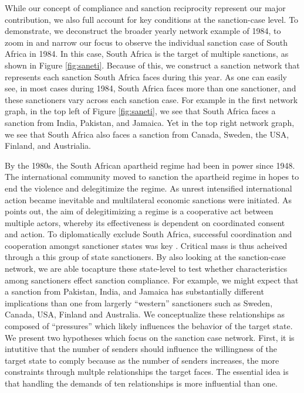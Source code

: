 While our concept of compliance and sanction reciprocity represent our major contribution, we also full account for key conditions at the sanction-case level. To demonstrate, we deconstruct the broader yearly network example of 1984, to zoom in and narrow our focus to observe the individual sanction case of South Africa in 1984. In this case, South Africa is the target of multiple sanctions, as shown in Figure \ref{fig:saneti}. Because of this, we construct a sanction network that represents each sanction South Africa faces during this year. As one can easily see, in most cases during 1984, South Africa faces more than one sanctioner, and these sanctioners vary across each sanction case. For example in the first network graph, in the top left of Figure \ref{fig:saneti}, we see that South Africa faces a sanction from India, Pakistan, and Jamaica. Yet in the top right network graph, we see that South Africa also faces a sanction from Canada, Sweden, the USA, Finland, and Austrialia. 

By the 1980s, the South African apartheid regime had been in power since 1948. The international community moved to sanction the apartheid regime in hopes to end the violence and delegitimize the regime. As unrest intensified international action became inevitable and multilateral economic sanctions were initiated. As \citet{kinne2013dependent} points out, the aim of delegitimizing a regime is a cooperative act between multiple actors, whereby its effectiveness is dependent on coordinated consent and action. To diplomatically exclude South Africa, successful coordination and cooperation amongst sanctioner states was key \citep{kinne2013dependent,christopher1994pattern}. Critical mass is thus acheived through a this group of state sanctioners. By also looking at the sanction-case network, we are able tocapture these state-level to test whether characteristics among sanctioners effect sanction compliance. For example, we might expect that a sanction from Pakistan, India, and Jamaica has substantially different implications than one from largerly ``western'' sanctioners such as Sweden, Canada, USA, Finland and Australia. We conceptualize these relationships as composed of ``pressures'' which likely influences the behavior of the target state. We present two hypotheses which focus on the sanction case network. First, it is intutitive that the number of senders should influence the willingness of the target state to comply because as the number of senders increases, the more constraints through multple relationships the target faces. The essential idea is that handling the demands of ten relationships is more influential than one. 


